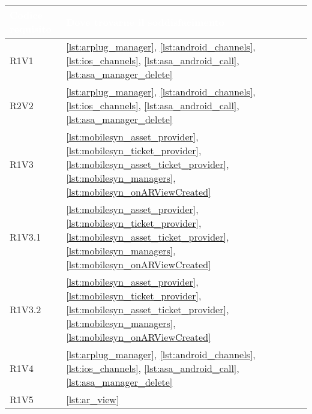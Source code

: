 {
    \setlength{\freewidth}{\dimexpr\textwidth-10\tabcolsep}
    \renewcommand{\arraystretch}{1.5}
    \centering
    \setlength{\aboverulesep}{0pt}
    \setlength{\belowrulesep}{0pt}
    \begin{longtable}{C{.3\freewidth} C{.4\freewidth}} 
       \toprule
    \textcolor{white}{\textbf{Codice requisito}}&
    \textcolor{white}{\textbf{Dove trovarne il soddisfacimento}}\\
    \toprule
    \endhead

    R1V1 &\ref{lst:arplug_manager}, \ref{lst:android_channels}, \ref{lst:ios_channels}, \ref{lst:asa_android_call}, \ref{lst:asa_manager_delete}\\
    R2V2 &\ref{lst:arplug_manager}, \ref{lst:android_channels}, \ref{lst:ios_channels}, \ref{lst:asa_android_call}, \ref{lst:asa_manager_delete}\\
    R1V3 &\ref{lst:mobilesyn_asset_provider}, \ref{lst:mobilesyn_ticket_provider}, \ref{lst:mobilesyn_asset_ticket_provider}, \ref{lst:mobilesyn_managers}, \ref{lst:mobilesyn_onARViewCreated}\\
    R1V3.1 &\ref{lst:mobilesyn_asset_provider}, \ref{lst:mobilesyn_ticket_provider}, \ref{lst:mobilesyn_asset_ticket_provider}, \ref{lst:mobilesyn_managers}, \ref{lst:mobilesyn_onARViewCreated}\\
    R1V3.2 &\ref{lst:mobilesyn_asset_provider}, \ref{lst:mobilesyn_ticket_provider}, \ref{lst:mobilesyn_asset_ticket_provider}, \ref{lst:mobilesyn_managers}, \ref{lst:mobilesyn_onARViewCreated}\\
    R1V4 &\ref{lst:arplug_manager}, \ref{lst:android_channels}, \ref{lst:ios_channels}, \ref{lst:asa_android_call}, \ref{lst:asa_manager_delete}\\
    R1V5 &\ref{lst:ar_view}\\


\end{longtable}}
